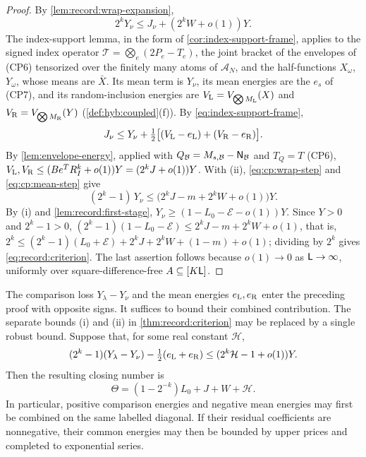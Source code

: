 \begin{proof}
By \cref{lem:record:wrap-expansion},
\begin{equation}\label{eq:cp:wrap-step}
 2^kY_\nu\le J_\nu+(2^kW+o(1))Y .
\end{equation}
The index-support lemma, in the form of \cref{cor:index-support-frame}, applies
to the signed index operator $\mathcal T=\bigotimes_e(2P_e-T_e)$, the joint
bracket of the envelopes of (CP6) tensorized over the finitely many atoms of
$\mathcal A_N$, and the half-functions $X_\omega$, $Y_\omega$, whose means are
$\bar X$. Its mean term is $Y_\nu$, its mean energies are the $e_s$ of (CP7),
and its random-inclusion energies are $V_{\rm L}=V_{\bigotimes M_{\rm L}}(X)$ and
$V_{\rm R}=V_{\bigotimes M_{\rm R}}(Y)$ (\cref{def:hyb:coupled}(f)). By
\eqref{eq:index-support-frame},
\begin{equation}\label{eq:cp:mean-step}
 J_\nu\le Y_\nu+\tfrac12\bigl[(V_{\rm L}-e_{\rm L})+(V_{\rm R}-e_{\rm R})\bigr].
\end{equation}
By \cref{lem:envelope-energy}, applied with $Q_{\mathcal B}=M_{s,\mathcal B}-\mathsf N_{\mathcal B}$
and $T_Q=T$ (CP6), $V_{\rm L},V_{\rm R}\le(Be^TR_I^k+o(1))Y=(2^kJ+o(1))Y$.
With (ii), \eqref{eq:cp:wrap-step} and \eqref{eq:cp:mean-step} give
\[
 (2^k-1)\,Y_\nu\le\bigl(2^kJ-m+2^kW+o(1)\bigr)Y .
\]
By (i) and \cref{lem:record:first-stage}, $Y_\nu\ge(1-L_0-\mathcal E-o(1))Y$.
Since $Y>0$ and $2^k-1>0$,
$(2^k-1)(1-L_0-\mathcal E)\le2^kJ-m+2^kW+o(1)$, that is,
$2^k\le(2^k-1)(L_0+\mathcal E)+2^kJ+2^kW+(1-m)+o(1)$; dividing by $2^k$ gives
\eqref{eq:record:criterion}. The last assertion follows because $o(1)\to0$ as
$\mathsf L\to\infty$, uniformly over square-difference-free $A\subseteq[K\mathsf L]$.
\end{proof}

\begin{corollary}\label{cor:joint-closing}
The comparison loss $Y_\lambda-Y_\nu$ and the mean energies
$e_{\rm L},e_{\rm R}$ enter the preceding proof with opposite signs.
It suffices to bound their combined contribution.
The separate bounds (i) and (ii) in \cref{thm:record:criterion} may be
replaced by a single robust bound. Suppose that, for some real
constant $\mathcal H$,
\[
 (2^k-1)(Y_\lambda-Y_\nu)-\tfrac12(e_{\rm L}+e_{\rm R})
 \le (2^k\mathcal H-1+o(1))Y.
\]
Then the resulting closing number is
\[
 \Theta=(1-2^{-k})L_0+J+W+\mathcal H.
\]
In particular, positive comparison energies and negative mean energies
may first be combined on the same labelled diagonal. If their residual
coefficients are nonnegative, their common energies may then be bounded
by upper prices and completed to exponential series.
\end{corollary}

